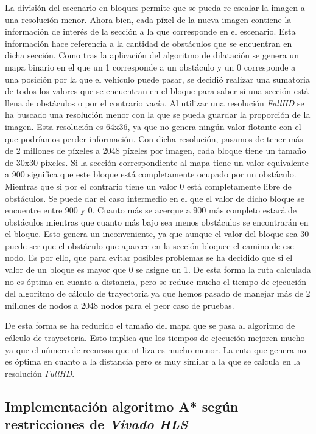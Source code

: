 La división del escenario en bloques permite que se pueda re-escalar la imagen a una resolución menor. Ahora bien, cada píxel de la nueva imagen contiene la información de interés de la sección a la que corresponde en el escenario. Esta información hace referencia a la cantidad de obstáculos que se encuentran en dicha sección. Como tras la aplicación del algoritmo de dilatación se genera un mapa binario en el que un 1 corresponde a un obstáculo y un 0 corresponde a una posición por la que el vehículo puede pasar, se decidió realizar una sumatoria de todos los valores que se encuentran en el bloque para saber si una sección está llena de obstáculos o por el contrario vacía. Al utilizar una resolución \emph{FullHD} se ha buscado una resolución menor con la que se pueda guardar la proporción de la imagen. Esta resolución es 64x36, ya que no genera ningún valor flotante con el que podríamos perder información. Con dicha resolución, pasamos de tener más de 2 millones de píxeles a 2048 píxeles por imagen, cada bloque tiene un tamaño de 30x30 píxeles. Si la sección correspondiente al mapa tiene un valor equivalente a 900 significa que este bloque está completamente ocupado por un obstáculo. Mientras que si por el contrario tiene un valor 0 está completamente libre de obstáculos. Se puede dar el caso intermedio en el que el valor de dicho bloque se encuentre entre 900 y 0. Cuanto más se acerque a 900 más completo estará de obstáculos mientras que cuanto más bajo sea menos obstáculos se encontrarán en el bloque. Esto genera un inconveniente, ya que aunque el valor del bloque sea 30 puede ser que el obstáculo que aparece en la sección bloquee el camino de ese nodo. Es por ello, que para evitar posibles problemas se ha decidido que si el valor de un bloque es mayor que 0 se asigne un 1. De esta forma la ruta calculada no es óptima en cuanto a distancia, pero se reduce mucho el tiempo de ejecución del algoritmo de cálculo de trayectoria ya que hemos pasado de manejar más de 2 millones de nodos a 2048 nodos para el peor caso de pruebas.

De esta forma se ha reducido el tamaño del mapa que se pasa al algoritmo de cálculo de trayectoria. Esto implica que los tiempos de ejecución mejoren mucho ya que el número de recursos que utiliza es mucho menor. La ruta que genera no es óptima en cuanto a la distancia pero es muy similar a la que se calcula en la resolución \emph{FullHD}.

\subsection{Implementación algoritmo A* según restricciones de \emph{Vivado HLS}}\label{sec:HLSCalculoTrayectoria}

